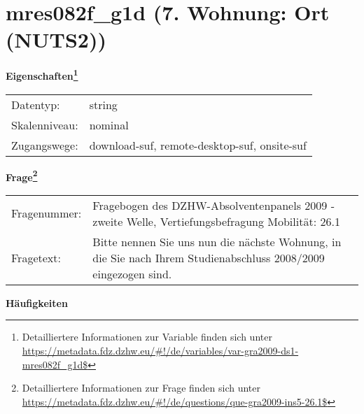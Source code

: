 
    \setcounter{footnote}{0}

    \vspace*{-1.8cm}
	\section{mres082f\_g1d (7. Wohnung: Ort (NUTS2))}
	\label{section:mres082f_g1d}



    \vspace*{0.5cm}
    \noindent\textbf{Eigenschaften\footnote{Detailliertere Informationen zur Variable finden sich unter
		\url{https://metadata.fdz.dzhw.eu/\#!/de/variables/var-gra2009-ds1-mres082f_g1d$}}}\\
	\begin{tabularx}{\hsize}{@{}lX}
	Datentyp: & string \\
	Skalenniveau: & nominal \\
	Zugangswege: &
	  download-suf, 
	  remote-desktop-suf, 
	  onsite-suf
 \\
    \end{tabularx}



				\vspace*{0.5cm}
                \noindent\textbf{Frage\footnote{Detailliertere Informationen zur Frage finden sich unter
		              \url{https://metadata.fdz.dzhw.eu/\#!/de/questions/que-gra2009-ins5-26.1$}}}\\
				\begin{tabularx}{\hsize}{@{}lX}
					Fragenummer: &
					  Fragebogen des DZHW-Absolventenpanels 2009 - zweite Welle, Vertiefungsbefragung Mobilität:
					  26.1
 \\
					Fragetext: & Bitte nennen Sie uns nun die nächste Wohnung, in die Sie nach Ihrem Studienabschluss 2008/2009 eingezogen sind. \\
				\end{tabularx}





        		\vspace*{0.5cm}
                \noindent\textbf{Häufigkeiten}

